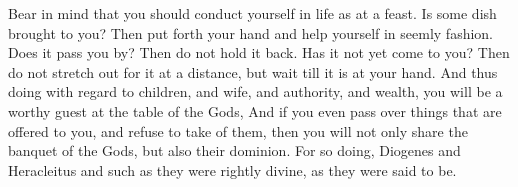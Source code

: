 Bear in mind  that you should conduct yourself  in life as at a  feast. Is some
dish brought  to you?  Then put  forth your  hand and  help yourself  in seemly
fashion. Does it pass you by? Then do not  hold it back. Has it not yet come to
you? Then do not stretch out for it at  a distance, but wait till it is at your
hand. And  thus doing  with regard  to children, and  wife, and  authority, and
wealth, you will  be a worthy guest at  the table of the Gods, And  if you even
pass over things that are offered to you,  and refuse to take of them, then you
will not only  share the banquet of  the Gods, but also their  dominion. For so
doing, Diogenes and  Heracleitus and such as they were  rightly divine, as they
were said to be.
